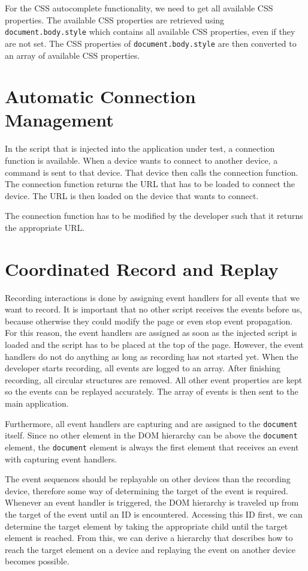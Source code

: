 For the CSS autocomplete functionality, we need to get all available CSS properties. The available CSS properties are retrieved using \lstinline|document.body.style| which contains all available CSS properties, even if they are not set. The CSS properties of \lstinline|document.body.style| are then converted to an array of available CSS properties.

\section{Automatic Connection Management}

In the script that is injected into the application under test, a connection function is available. When a device wants to connect to another device, a command is sent to that device. That device then calls the connection function. The connection function returns the URL that has to be loaded to connect the device. The URL is then loaded on the device that wants to connect.

The connection function has to be modified by the developer such that it returns the appropriate URL.

\section{Coordinated Record and Replay}

Recording interactions is done by assigning event handlers for all events that we want to record. It is important that no other script receives the events before us, because otherwise they could modify the page or even stop event propagation. For this reason, the event handlers are assigned as soon as the injected script is loaded and the script has to be placed at the top of the page. However, the event handlers do not do anything as long as recording has not started yet. When the developer starts recording, all events are logged to an array. After finishing recording, all circular structures are removed. All other event properties are kept so the events can be replayed accurately. The array of events is then sent to the main application. 

Furthermore, all event handlers are capturing and are assigned to the \lstinline|document| itself. Since no other element in the DOM hierarchy can be above the \lstinline|document| element, the \lstinline|document| element is always the first element that receives an event with capturing event handlers. 

The event sequences should be replayable on other devices than the recording device, therefore some way of determining the target of the event is required. Whenever an event handler is triggered, the DOM hierarchy is traveled up from the target of the event until an ID is encountered. Accessing this ID first, we can determine the target element by taking the appropriate child until the target element is reached. From this, we can derive a hierarchy that describes how to reach the target element on a device and replaying the event on another device becomes possible.

